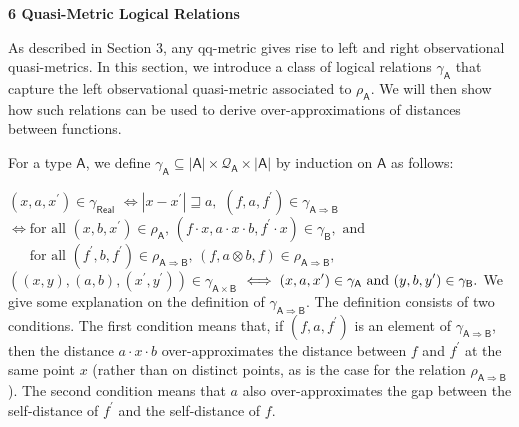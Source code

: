 \documentclass[10pt,a4paper]{amsart}
\begin{document}
 
 
 


 
\par\medskip\noindent\textbf{6 Quasi-Metric Logical Relations}\par
 
 
As described in Section 3, any qq-metric gives rise to left and right observational quasi-metrics. In this section, we introduce a class of logical relations $\gamma_{\mathsf{A}}$ that capture the left observational quasi-metric associated to $\rho_{{\mathsf{A}}}$. We will then show how such relations can be used to derive over-approximations of distances between functions.\par
 
 
 
For a type $\mathsf{A}$, we define $\gamma_{\mathsf{A}}\subseteq|\mathsf{A}|\times\mathcal{Q}_{\mathsf{A}}\times|%
\mathsf{A}|$ by induction on $\mathsf{A}$ as follows:\par
    $\displaystyle(x,a,x^{\prime})\in\gamma_{\mathsf{Real}}$ $\displaystyle\iff|x-x^{\prime}|\sqsupseteq a,$     $\displaystyle(f,a,f^{\prime})\in\gamma_{\mathsf{A}\Rightarrow\mathsf{B}}$ $\displaystyle\iff\text{for all }(x,b,x^{\prime})\in\rho_{\mathsf{A}},\,(f\cdot
x%
,a\cdot x\cdot b,f^{\prime}\cdot x)\in\gamma_{\mathsf{B}},\text{ and}$      $\displaystyle\mathrel{\phantom{\iff}}\text{for all }(f^{\prime},b,f^{\prime})%
\in\rho_{\mathsf{A}\Rightarrow\mathsf{B}},\,(f,a\otimes b,f)\in\rho_{\mathsf{A%
}\Rightarrow\mathsf{B}},$     $\displaystyle((x,y),(a,b),(x^{\prime},y^{\prime}))\in\gamma_{\mathsf{A}\times%
\mathsf{B}}$ $\displaystyle\iff(x,a,x^{\prime})\in\gamma_{\mathsf{A}}\text{ and }(y,b,y^{%
\prime})\in\gamma_{\mathsf{B}}.$    
We give some explanation on the definition of $\gamma_{\mathsf{A}\Rightarrow\mathsf{B}}$. The definition consists of two conditions. The first condition means that, if $(f,a,f^{\prime})$ is an element of $\gamma_{\mathsf{A}\Rightarrow\mathsf{B}}$, then the distance $a\cdot x\cdot b$ over-approximates the distance between $f$ and $f^{\prime}$ at the same point $x$ (rather than on distinct points, as is the case for the relation $\rho_{\mathsf{A}\Rightarrow\mathsf{B}}$). The second condition means that $a$ also over-approximates the gap between the self-distance of $f^{\prime}$ and the self-distance of $f$.\par
 
\end{document}
